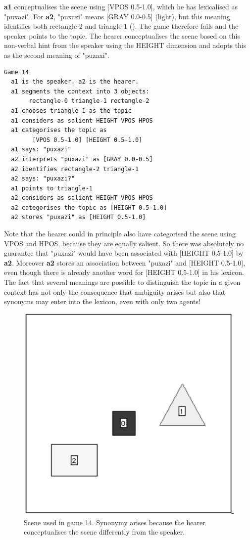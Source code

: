 {\bf a1} conceptualises the scene using 
[VPOS 0.5-1.0], which he has lexicalised as "puxazi". 
For {\bf a2}, "puxazi" means [GRAY 0.0-0.5] (light), but this 
meaning identifies both rectangle-2 and
triangle-1 (). The game therefore
fails and the speaker points to the topic. The hearer
conceptualises the scene based on this non-verbal
hint from the speaker using the HEIGHT dimension and adopts this as the second meaning 
of "puzaxi". 
\begin{verbatim}
Game 14
  a1 is the speaker. a2 is the hearer. 
  a1 segments the context into 3 objects: 
       rectangle-0 triangle-1 rectangle-2
  a1 chooses triangle-1 as the topic 
  a1 considers as salient HEIGHT VPOS HPOS 
  a1 categorises the topic as 
        [VPOS 0.5-1.0] [HEIGHT 0.5-1.0]
  a1 says: "puxazi"
  a2 interprets "puxazi" as [GRAY 0.0-0.5]
  a2 identifies rectangle-2 triangle-1
  a2 says: "puxazi?"
  a1 points to triangle-1
  a2 considers as salient HEIGHT VPOS HPOS 
  a2 categorises the topic as [HEIGHT 0.5-1.0]
  a2 stores "puxazi" as [HEIGHT 0.5-1.0]
\end{verbatim}
Note that the hearer could in principle 
also have categorised the
scene using VPOS and HPOS, because they are
equally salient. So there was absolutely no 
guarantee that "puxazi" would have been associated 
with [HEIGHT 0.5-1.0] by {\bf a2}. Moreover {\bf a2} stores
an association between "puxazi" and [HEIGHT 0.5-1.0], even though 
there is already another word for 
[HEIGHT 0.5-1.0] in his lexicon. The fact that 
several meanings are possible to distinguish the topic in a given 
context has not only the consequence that ambiguity
arises but also that synonyms may enter into the lexicon, 
even with only two agents!
\begin{figure}[htbp]
  \centerline{\includegraphics[width=.40\textwidth]{chap6/figs/scene-game14}}
\caption{\label{scene-game14} Scene used
in game 14. Synonymy arises because the hearer conceptualises
the scene differently from the speaker.}
\end{figure}

